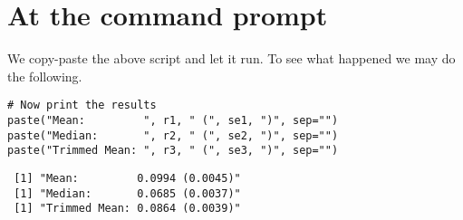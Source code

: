 \documentclass[11pt,english]{article}
\begin{document}
\section*{At the command prompt}
\label{sec-2}

We copy-paste the above script and let it run. To see what happened we may do the following.

\begin{verbatim}
# Now print the results
paste("Mean:         ", r1, " (", se1, ")", sep="")
paste("Median:       ", r2, " (", se2, ")", sep="")
paste("Trimmed Mean: ", r3, " (", se3, ")", sep="")
\end{verbatim}

\begin{verbatim}
 [1] "Mean:         0.0994 (0.0045)"
 [1] "Median:       0.0685 (0.0037)"
 [1] "Trimmed Mean: 0.0864 (0.0039)"
\end{verbatim}
\end{document}
